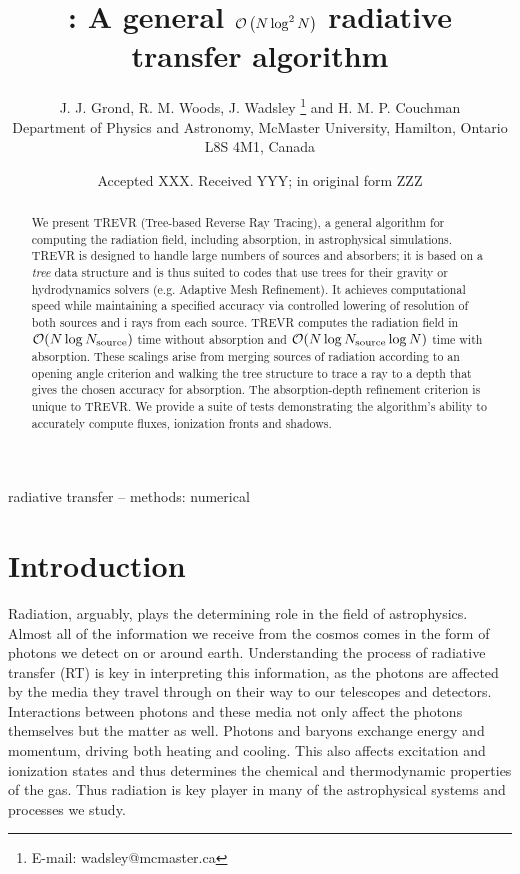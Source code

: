 \documentclass[fleq,usenatbib]{mnras}
\title[]{\acro{}: A general $\mathcal{O}\left(N\log^2N\right)$ radiative transfer algorithm}
\author[J. J. Grond et al.]{
J. J. Grond,
R. M. Woods,
J. Wadsley \thanks{E-mail:  wadsley@mcmaster.ca}
and H. M. P. Couchman
\\
Department of Physics and Astronomy, McMaster University, Hamilton, Ontario L8S
 4M1, Canada}
\date{Accepted XXX. Received YYY; in original form ZZZ}
\newcommand{\acro}{TREVR}
\newcommand{\NS}{N_{\rm source}}
\begin{document}
\label{firstpage}
\pagerange{\pageref{firstpage}--\pageref{lastpage}}
\maketitle

\begin{abstract}
We present \acro{} (Tree-based Reverse Ray Tracing), a general algorithm for 
computing the radiation field, including absorption, in astrophysical 
simulations. \acro{} is designed to handle large numbers of sources and 
absorbers; it is based on a \emph{tree} data structure and is thus suited 
to codes that use trees for their gravity or hydrodynamics solvers (e.g. 
Adaptive Mesh Refinement). It achieves computational speed while maintaining a 
specified accuracy via controlled lowering of resolution of both sources and i
rays from each source. \acro{} computes the radiation field in $\mathcal{O}(N 
\log \NS)$ time without absorption and $\mathcal{O}(N \log \NS \log{N})$ time 
with absorption.  These scalings arise from merging sources of radiation 
according to an opening angle criterion and walking the tree structure to 
trace a ray to a depth that gives the chosen accuracy for absorption. The 
absorption-depth refinement criterion is unique to \acro{}. We provide a suite 
of tests demonstrating the algorithm's ability to accurately compute fluxes, 
ionization fronts and shadows.   

\end{abstract}

\begin{keywords}
radiative transfer -- methods: numerical
\end{keywords}



\section{Introduction}\label{sec:intr}
Radiation, arguably, plays the determining role in the field of astrophysics. 
Almost all of the information we receive from the cosmos comes in the form of 
photons we detect on or around earth. Understanding the process of radiative 
transfer (RT) is key in interpreting this information, as the photons are 
affected by the media they travel through on their way to our telescopes and 
detectors. Interactions between photons and these media not only affect the 
photons themselves but the matter as well. Photons and baryons exchange energy 
and momentum, driving both heating and cooling. This also affects excitation 
and ionization states and thus determines the chemical and thermodynamic 
properties of the gas. Thus radiation is key player in many of the 
astrophysical systems and processes we study.
\end{document}

